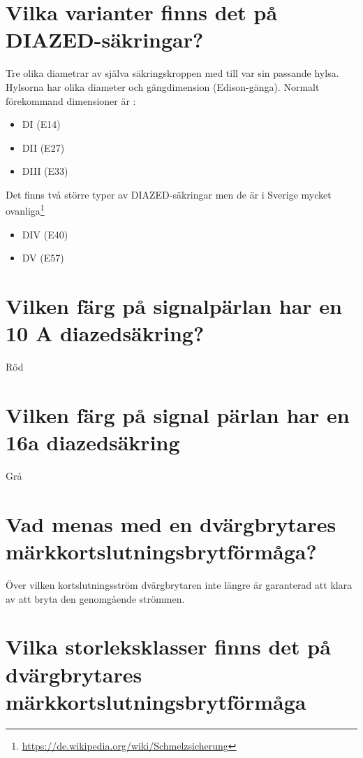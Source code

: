 \documentclass[a4paper,swedish]{article}
\begin{document}
\setcounter{section}{7}
\section{Vilka varianter finns det på DIAZED-säkringar?}\label{sec:diazedvarianter}

Tre olika diametrar av själva säkringskroppen med till var sin passande hylsa.
Hylsorna har olika diameter och gängdimension (Edison-gänga). Normalt förekommand dimensioner är :
\begin{itemize}
\item  DI (E14)
\item DII (E27)
\item DIII (E33)
\end{itemize}

Det finns två större typer av DIAZED-säkringar men de är i Sverige mycket ovanliga\footnote{\url{https://de.wikipedia.org/wiki/Schmelzsicherung}}
\begin{itemize}
\item DIV (E40)
\item DV (E57)
\end{itemize}

\setcounter{section}{9}
\section{Vilken färg på signalpärlan har en 10 A diazedsäkring?}\label{sec:diazed_10A}

Röd

\section{Vilken färg på signal pärlan har en 16a diazedsäkring}
\label{sec:q_11}
Grå

\section{Vad menas med en dvärgbrytares märkkortslutningsbrytförmåga?}\label{sec:RCD_short_interrupt}

Över vilken kortslutningsström dvärgbrytaren inte längre är garanterad att klara av att bryta
den genomgående strömmen.

\section{Vilka storleksklasser finns det på dvärgbrytares märkkortslutningsbrytförmåga }
\label{sec:q_13}
\end{document}
